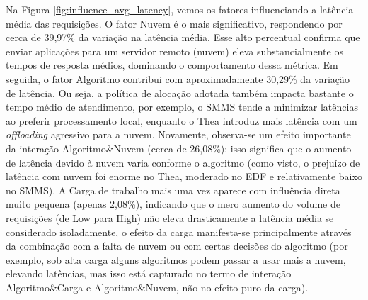 Na Figura \ref{fig:influence_avg_latency}, vemos os fatores influenciando a latência média das requisições. O fator Nuvem é o mais significativo, respondendo por cerca de 39,97\% da variação na latência média. Esse alto percentual confirma que enviar aplicações para um servidor remoto (nuvem) eleva substancialmente os tempos de resposta médios, dominando o comportamento dessa métrica. Em seguida, o fator Algoritmo contribui com aproximadamente 30,29\% da variação de latência. Ou seja, a política de alocação adotada também impacta bastante o tempo médio de atendimento, por exemplo, o SMMS tende a minimizar latências ao preferir processamento local, enquanto o Thea introduz mais latência com um \textit{offloading} agressivo para a nuvem. Novamente, observa-se um efeito importante da interação Algoritmo\&Nuvem (cerca de 26,08\%): isso significa que o aumento de latência devido à nuvem varia conforme o algoritmo (como visto, o prejuízo de latência com nuvem foi enorme no Thea, moderado no EDF e relativamente baixo no SMMS). A Carga de trabalho mais uma vez aparece com influência direta muito pequena (apenas 2,08\%), indicando que o mero aumento do volume de requisições (de Low para High) não eleva drasticamente a latência média se considerado isoladamente, o efeito da carga manifesta-se principalmente através da combinação com a falta de nuvem ou com certas decisões do algoritmo (por exemplo, sob alta carga alguns algoritmos podem passar a usar mais a nuvem, elevando latências, mas isso está capturado no termo de interação Algoritmo\&Carga e Algoritmo\&Nuvem, não no efeito puro da carga).



